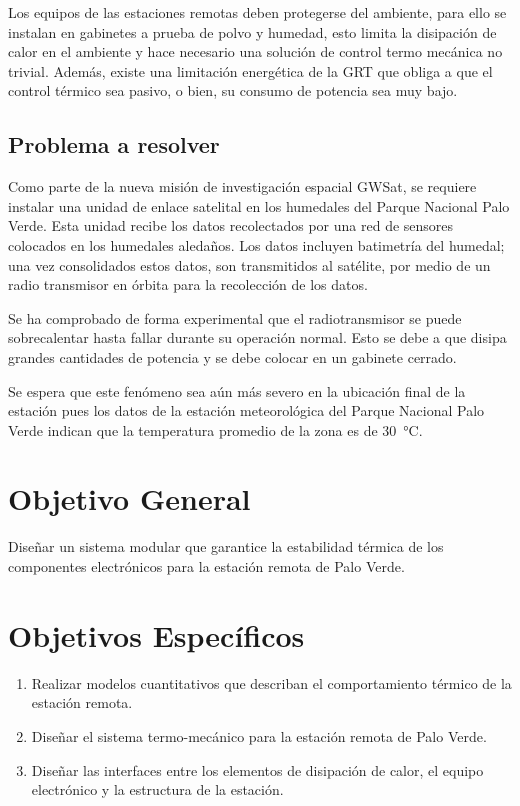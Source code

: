 Los equipos de las estaciones remotas deben protegerse del ambiente, para ello se instalan en gabinetes a prueba de polvo y humedad, esto limita la disipación de calor en el ambiente y hace necesario una solución de control termo mecánica no trivial. Además, existe una limitación energética de la GRT que obliga a que el control térmico sea pasivo, o bien, su consumo de potencia sea muy bajo.

\subsection{Problema a resolver}
Como parte de la nueva misión de investigación espacial GWSat, se requiere instalar una unidad de enlace satelital en los humedales del Parque Nacional Palo Verde.  Esta unidad recibe los datos recolectados por una red de sensores colocados en los humedales aledaños. Los datos incluyen batimetría del humedal; una vez consolidados estos datos, son transmitidos al satélite, por medio de un radio transmisor en órbita para la recolección de los datos.

Se ha comprobado de forma experimental que el radiotransmisor se puede sobrecalentar hasta fallar durante su operación normal. Esto se debe a que disipa grandes cantidades de potencia y se debe colocar en un gabinete cerrado.

Se espera que este fenómeno sea aún más severo en la ubicación final de la estación pues los datos de la estación meteorológica del Parque Nacional Palo Verde indican que la temperatura promedio de la zona es de \SI{30}{\celsius}.

\section{Objetivo General}
Diseñar un sistema modular que garantice la estabilidad térmica de los componentes electrónicos para la estación remota de Palo Verde.

\section{Objetivos Específicos}
\begin{enumerate}
    \item Realizar modelos cuantitativos que describan el comportamiento térmico de la estación remota. 
    \item Diseñar el sistema termo-mecánico para la estación remota de Palo Verde.
    \item Diseñar las interfaces entre los elementos de disipación de calor, el equipo electrónico y la estructura de la estación.
\end{enumerate}

